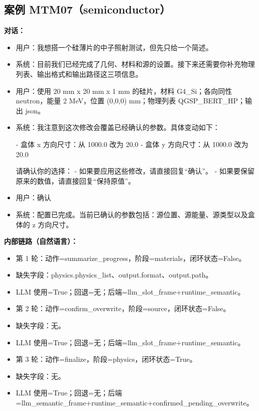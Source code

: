 \documentclass[11pt]{ctexart}
\begin{document}
\subsection{案例 MTM07（semiconductor）}
\textbf{对话：}
\begin{itemize}
\item 用户：我想搭一个硅薄片的中子照射测试，但先只给一个简述。
\item 系统：目前我们已经完成了几何、材料和源的设置。接下来还需要你补充物理列表、输出格式和输出路径这三项信息。
\item 用户：使用 20 mm x 20 mm x 1 mm 的硅片，材料 G4\_Si；各向同性 neutron，能量 2 MeV，位置 (0,0,0) mm；物理列表 QGSP\_BERT\_HP；输出 json。
\item 系统：我注意到这次修改会覆盖已经确认的参数。具体变动如下：

- 盒体 x 方向尺寸：从 1000.0 改为 20.0
- 盒体 y 方向尺寸：从 1000.0 改为 20.0

请确认你的选择：
- 如果要应用这些修改，请直接回复“确认”。
- 如果要保留原来的数值，请直接回复“保持原值”。
\item 用户：确认
\item 系统：配置已完成。当前已确认的参数包括：源位置、源能量、源类型以及盒体的 z 方向尺寸。
\end{itemize}
\textbf{内部链路（自然语言）：}
\begin{itemize}
\item 第 1 轮：动作=summarize\_progress，阶段=materials，闭环状态=False。
\item 缺失字段：physics.physics\_list、output.format、output.path。
\item LLM 使用=True；回退=无；后端=llm\_slot\_frame+runtime\_semantic。
\item 第 2 轮：动作=confirm\_overwrite，阶段=source，闭环状态=False。
\item 缺失字段：无。
\item LLM 使用=True；回退=无；后端=llm\_slot\_frame+runtime\_semantic。
\item 第 3 轮：动作=finalize，阶段=physics，闭环状态=True。
\item 缺失字段：无。
\item LLM 使用=True；回退=无；后端=llm\_semantic\_frame+runtime\_semantic+confirmed\_pending\_overwrite。
\end{itemize}
\end{document}
